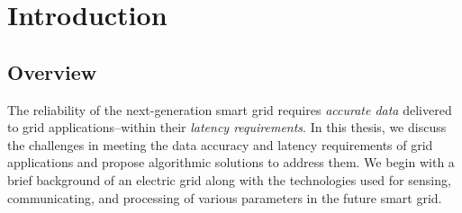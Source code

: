\chapter{Introduction} \label{chap-intro}
\section{Overview}
The reliability of the next-generation smart grid requires \emph{accurate data} delivered to grid applications--within their \emph{latency requirements}.  In this thesis, we discuss the challenges in meeting the data accuracy and latency requirements of grid applications and propose algorithmic solutions to address them. We begin with a brief background of an electric grid along with the technologies used for sensing, communicating, and processing of various parameters in the future smart grid.  
